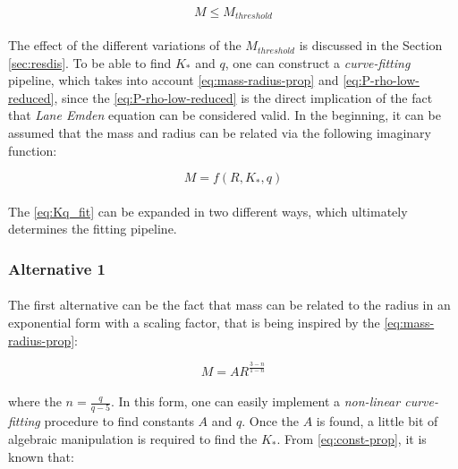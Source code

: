 \documentclass[letterpaper,12pt]{article}
\begin{document}
\begin{equation*}
    M \leqslant M_{threshold}
\end{equation*}

\paragraph{} The effect of the different variations of the $M_{threshold}$ is discussed in the Section \ref{sec:resdis}. To be able to find $K_*$ and $q$, one can construct a \textit{curve-fitting} pipeline, which takes into account \eqref{eq:mass-radius-prop} and \eqref{eq:P-rho-low-reduced}, since the \eqref{eq:P-rho-low-reduced} is the direct implication of the fact that \textit{Lane Emden} equation can be considered valid. In the beginning, it can be assumed that the mass and radius can be related via the following imaginary function:

\begin{equation}
    \label{eq:Kq_fit}
    M = f(R, K_*, q)
\end{equation}

\paragraph{} The \eqref{eq:Kq_fit} can be expanded in two different ways, which ultimately determines the fitting pipeline.

\subsubsection{Alternative 1}

\paragraph{} The first alternative can be the fact that mass can be related to the radius in an exponential form with a scaling factor, that is being inspired by the \eqref{eq:mass-radius-prop}:

\begin{equation*}
    M = A R^{\frac{3-n}{1-n}}
\end{equation*}

\paragraph{} where the $n = \frac{q}{q-5}$. In this form, one can easily implement a \textit{non-linear curve-fitting} procedure to find constants $A$ and $q$. Once the $A$ is found, a little bit of algebraic manipulation is required to find the $K_*$. From \eqref{eq:const-prop}, it is known that:
\end{document}
